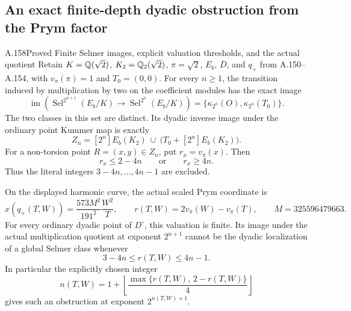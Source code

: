\subsection{An exact finite-depth dyadic obstruction from the Prym factor}

\begin{statement}{A.158}{Proved}
{Finite Selmer images, explicit valuation thresholds, and the actual quotient}
Retain \(K=\mathbb Q(\sqrt2)\), \(K_2=\mathbb Q_2(\sqrt2)\),
\(\pi=\sqrt2\), \(E_b\), \(\overline D\), and \(q_+\) from
A.150--A.154, with \(v_\pi(\pi)=1\) and \(T_0=(0,0)\).
For every \(n\geq1\), the transition induced by multiplication
by two on the coefficient modules has the exact image
\[
 \operatorname{im}\left(
 \operatorname{Sel}^{2^{n+1}}(E_b/K)
 \longrightarrow\operatorname{Sel}^{2^n}(E_b/K)\right)
       =\{\kappa_{2^n}(O),\kappa_{2^n}(T_0)\}.
\tag{A.158.1}
\]
The two classes in this set are distinct.
Its dyadic inverse image under the ordinary point Kummer map is
exactly
\[
 Z_n=[2^n]E_b(K_2)\ \cup\
                  \bigl(T_0+[2^n]E_b(K_2)\bigr).
\tag{A.158.2}
\]
For a non-torsion point \(R=(x,y)\in Z_n\), put
\(r_x=v_\pi(x)\).  Then
\[
                 r_x\leq2-4n\qquad\text{or}\qquad r_x\geq4n.
\tag{A.158.3}
\]
Thus the literal integers \(3-4n,\ldots,4n-1\) are excluded.

On the displayed harmonic curve, the actual scaled Prym coordinate is
\[
 x(q_+(T,W))
     =\frac{573M^2}{191^2}\frac{W^2}{T},
 \qquad
 r(T,W)=2v_\pi(W)-v_\pi(T),\qquad M=325596479663.
\tag{A.158.4}
\]
For every ordinary dyadic point of \(D^\circ\), this valuation
is finite.  Its image under the actual multiplication quotient
at exponent \(2^{n+1}\) cannot be the dyadic localization of
a global Selmer class whenever
\[
 3-4n\leq r(T,W)\leq4n-1.
\tag{A.158.5}
\]
In particular the explicitly chosen integer
\[
 n(T,W)=1+\left\lfloor
                    \frac{\max\{r(T,W),\,2-r(T,W)\}}4
                         \right\rfloor
\tag{A.158.6}
\]
gives such an obstruction at exponent \(2^{n(T,W)+1}\).


\end{statement}
